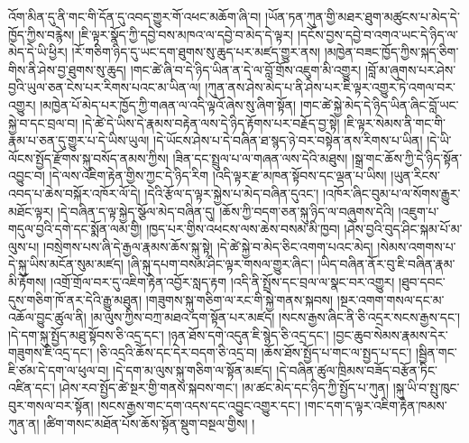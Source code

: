 འོག་མིན་དུ་ནི་གང་གི་དོན་དུ་འབད་གྱུར་གོ་འཕང་མཆོག་ཞི་བ། །ཡོན་ཏན་ཀུན་གྱི་མཐར་ཐུག་མཚུངས་པ་མེད་དེ་ཁྱོད་ཀྱིས་བརྙེས། །ཇི་ལྟར་སྣོད་ཀྱི་དབྱེ་བས་མཁའ་ལ་དབྱེ་བ་མེད་དེ་ལྟར། །དངོས་བྱས་དབྱེ་བ་འགའ་ཡང་དེ་ཉིད་ལ་མེད་དེ་ཡི་ཕྱིར། །རོ་གཅིག་ཉིད་དུ་ཡང་དག་ཐུགས་སུ་ཆུད་པར་མཛད་གྱུར་ནས། །མཁྱེན་བཟང་ཁྱོད་ཀྱིས་སྐད་ཅིག་གིས་ནི་ཤེས་བྱ་ཐུགས་སུ་ཆུད། །གང་ཚེ་ཞི་བ་དེ་ཉིད་ཡིན་ན་དེ་ལ་བློ་གྲོས་འཇུག་མི་འགྱུར། །བློ་མ་ཞུགས་པར་ཤེས་བྱའི་ཡུལ་ཅན་ངེས་པར་རིགས་པའང་མ་ཡིན་ལ། །ཀུན་ནས་ཤེས་མེད་པ་ནི་ཤེས་པར་ཇི་ལྟར་འགྱུར་ཏེ་འགལ་བར་འགྱུར། །མཁྱེན་པོ་མེད་པར་ཁྱོད་ཀྱི་གཞན་ལ་འདི་ལྟའོ་ཞེས་སུ་ཞིག་སྟོན། །གང་ཚེ་སྐྱེ་མེད་དེ་ཉིད་ཡིན་ཞིང་བློ་ཡང་སྐྱེ་བ་དང་བྲལ་བ། །དེ་ཚེ་དེ་ཡིས་དེ་རྣམས་བརྟེན་ལས་དེ་ཉིད་རྟོགས་པར་བརྗོད་བྱ་སྟེ། །ཇི་ལྟར་སེམས་ནི་གང་གི་རྣམ་པ་ཅན་དུ་གྱུར་པ་དེ་ཡིས་ཡུལ། །དེ་ཡོངས་ཤེས་པ་དེ་བཞིན་ཐ་སྙད་ཉེ་བར་བསྟེན་ནས་རིགས་པ་ཡིན། །དེ་ཡི་ལོངས་སྤྱོད་རྫོགས་སྐུ་བསོད་ནམས་ཀྱིས། །ཟིན་དང་སྤྲུལ་པ་ལ་གཞན་ལས་དེའི་མཐུས། །སྒྲ་གང་ཆོས་ཀྱི་དེ་ཉིད་སྟོན་འབྱུང་བ། །དེ་ལས་འཇིག་རྟེན་གྱིས་ཀྱང་དེ་ཉིད་རིག །འདི་ལྟར་རྫ་མཁན་སྟོབས་དང་ལྡན་པ་ཡིས། །ཡུན་རིངས་འབད་པ་ཆེས་བསྐོར་འཁོར་ལོ་དེ། །དེའི་རྩོལ་ད་ལྟར་སྐྱེས་པ་མེད་བཞིན་དུའང་། །འཁོར་ཞིང་བུམ་པ་ལ་སོགས་རྒྱུར་མཐོང་ལྟར། །དེ་བཞིན་ད་ལྟ་སྐྱེད་སྩོལ་མེད་བཞིན་དུ། །ཆོས་ཀྱི་བདག་ཅན་སྐུ་ཉིད་ལ་བཞུགས་དེའི། །འཇུག་པ་གདུལ་བྱའི་དགེ་དང་སྨོན་ལམ་གྱི། །ཁྱད་པར་གྱིས་འཕངས་ལས་ཆེས་བསམ་མི་ཁྱབ། །ཤེས་བྱའི་བུད་ཤིང་སྐམ་པོ་མ་ལུས་པ། །བསྲེགས་པས་ཞི་དེ་རྒྱལ་རྣམས་ཆོས་སྐུ་སྟེ། །དེ་ཚེ་སྐྱེ་བ་མེད་ཅིང་འགག་པའང་མེད། །སེམས་འགགས་པ་དེ་སྐུ་ཡིས་མངོན་སུམ་མཛད། །ཞི་སྐུ་དཔག་བསམ་ཤིང་ལྟར་གསལ་གྱུར་ཞིང་། །ཡིད་བཞིན་ནོར་བུ་ཇི་བཞིན་རྣམ་མི་རྟོགས། །འགྲོ་གྲོལ་བར་དུ་འཇིག་རྟེན་འབྱོར་སླད་རྟག །འདི་ནི་སྤྲོས་དང་བྲལ་ལ་སྣང་བར་འགྱུར། །ཐུབ་དབང་དུས་གཅིག་ཁོ་ནར་དེའི་རྒྱུ་མཐུན། །གཟུགས་སྐུ་གཅིག་ལ་རང་གི་སྐྱེ་གནས་སྐབས། །སྔར་འགག་གསལ་དང་མ་འཆོལ་བྱུང་ཚུལ་ནི། །མ་ལུས་ཀྱིས་བཀྲ་མཐའ་དག་སྟོན་པར་མཛད། །སངས་རྒྱས་ཞིང་ནི་ཅི་འདྲར་སངས་རྒྱས་དང་། །དེ་དག་སྐུ་སྤྱོད་མཐུ་སྟོབས་ཅི་འདྲ་དང་། །ཉན་ཐོས་དགེ་འདུན་ཇི་སྙེད་ཅི་འདྲ་དང་། །བྱང་ཆུབ་སེམས་རྣམས་དེར་གཟུགས་ཇི་འདྲ་དང་། །ཅི་འདྲའི་ཆོས་དང་དེར་བདག་ཅི་འདྲ་བ། །ཆོས་ཐོས་སྤྱོད་པ་གང་ལ་སྤྱད་པ་དང་། །སྦྱིན་གང་ཇི་ཙམ་དེ་དག་ལ་ཕུལ་བ། །དེ་དག་མ་ལུས་སྐུ་གཅིག་ལ་སྟོན་མཛད། །དེ་བཞིན་ཚུལ་ཁྲིམས་བཟོད་བརྩོན་ཏིང་འཛིན་དང་། །ཤེས་རབ་སྤྱོད་ཚེ་སྔར་གྱི་གནས་སྐབས་གང་། །མ་ཚང་མེད་དང་ཉིད་ཀྱི་སྤྱོད་པ་ཀུན། །སྐུ་ཡི་བ་སྤུ་ཁུང་བུར་གསལ་བར་སྟོན། །སངས་རྒྱས་གང་དག་འདས་དང་འབྱུང་འགྱུར་དང་། །གང་དག་ད་ལྟར་འཇིག་རྟེན་ཁམས་ཀུན་ན། །ཚིག་གསང་མཐོན་པོས་ཆོས་སྟོན་སྡུག་བསྔལ་གྱིས། །
